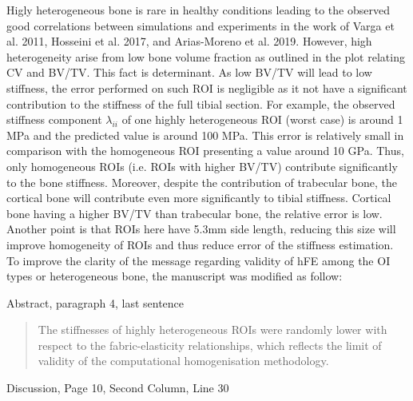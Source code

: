 \documentclass{AR2RC}
\begin{document}
\AR Higly heterogeneous bone is rare in healthy conditions leading to the observed good correlations between simulations and experiments in the work of Varga et al. 2011, Hosseini et al. 2017, and Arias-Moreno et al. 2019. However, high heterogeneity arise from low bone volume fraction as outlined in the plot relating CV and BV/TV. This fact is determinant. As low BV/TV will lead to low stiffness, the error performed on such ROI is negligible as it not have a significant contribution to the stiffness of the full tibial section. For example, the observed stiffness component $\lambda_{ii}$ of one highly heterogeneous ROI (worst case) is around 1 MPa and the predicted value is around 100 MPa. This error is relatively small in comparison with the homogeneous ROI presenting a value around 10 GPa. Thus, only homogeneous ROIs (i.e. ROIs with higher BV/TV) contribute significantly to the bone stiffness. Moreover, despite the contribution of trabecular bone, the cortical bone will contribute even more significantly to tibial stiffness. Cortical bone having a higher BV/TV than trabecular bone, the relative error is low. Another point is that ROIs here have 5.3mm side length, reducing this size will improve homogeneity of ROIs and thus reduce error of the stiffness estimation. To improve the clarity of the message regarding validity of hFE among the OI types or heterogeneous bone, the manuscript was modified as follow:

Abstract, paragraph 4, last sentence
\begin{quote}
	The stiffnesses of highly heterogeneous ROIs were randomly lower with respect to the fabric-elasticity relationships, which reflects the limit of validity of the computational homogenisation methodology. 
\end{quote}

Discussion, Page 10, Second Column, Line 30
\begin{quote}
\end{quote}
\end{document}
